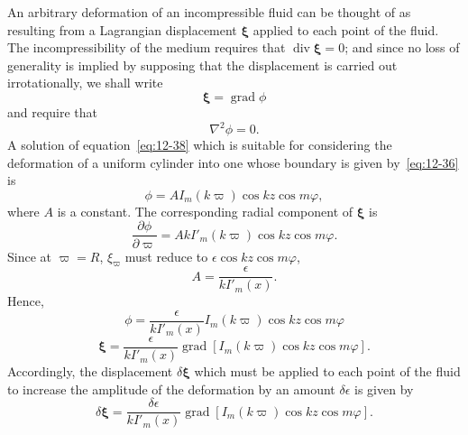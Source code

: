 An arbitrary deformation of an incompressible fluid can be thought of as resulting from a Lagrangian displacement $\boldsymbol\xi$ applied to each point of the fluid. The incompressibility of the medium requires that $\operatorname{div}\boldsymbol\xi = 0$; and since no loss of generality is implied by supposing that the displacement is carried out irrotationally, we shall write
\begin{equation}
\label{eq:12-37}
\boldsymbol\xi = \operatorname{grad} \phi
\end{equation}
and require that
\begin{equation}
\label{eq:12-38}
\nabla^2 \phi = 0.
\end{equation}
A solution of equation~\eqref{eq:12-38} which is suitable for considering the deformation of a uniform cylinder into one whose boundary is given by~\eqref{eq:12-36} is
\begin{equation}
\label{eq:12-39}
\phi = A I_m(k\varpi) \cos kz \cos m\varphi,
\end{equation}
where $A$ is a constant. The corresponding radial component of $\boldsymbol\xi$ is
\begin{equation}
\label{eq:12-40}
\frac{\partial \phi}{\partial \varpi} = Ak I'_m(k\varpi) \cos kz \cos m\varphi.
\end{equation}
Since at $\varpi = R$, $\xi_\varpi$ must reduce to $\epsilon \cos kz \cos m\varphi$,
\begin{equation}
\label{eq:12-41}
A = \frac{\epsilon}{k I'_m(x)}.
\end{equation}
Hence,
\begin{equation}
\label{eq:12-42}
\phi = \frac{\epsilon}{k I'_m(x)} I_m(k\varpi) \cos kz \cos m\varphi
\end{equation}
\begin{equation}
\label{eq:12-43}
\boldsymbol\xi = \frac{\epsilon}{k I'_m(x)} \operatorname{grad}[I_m(k\varpi) \cos kz \cos m\varphi].
\end{equation}
Accordingly, the displacement $\delta\boldsymbol\xi$ which must be applied to each point of the fluid to increase the amplitude of the deformation by an amount $\delta\epsilon$ is given by
\begin{equation}
\label{eq:12-44}
\delta\boldsymbol\xi = \frac{\delta\epsilon}{k I'_m(x)} \operatorname{grad}[I_m(k\varpi) \cos kz \cos m\varphi].
\end{equation}

